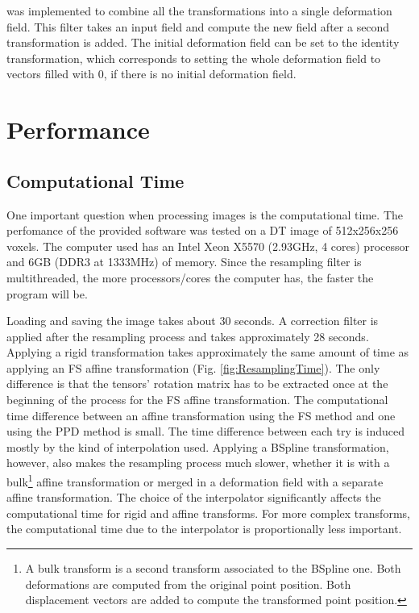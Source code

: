 \documentclass{InsightArticle}
\begin{document}
 was implemented to combine all the transformations into a single deformation field. This filter takes an input field and compute the new field after a second transformation is added. The initial deformation field can be set to the identity transformation, which corresponds to setting the whole deformation field to vectors filled with 0, if there is no initial deformation field.


\section{Performance}
\subsection{Computational Time}

One important question when processing images is the computational time. The perfomance of the provided software was tested on a DT image of 512x256x256 voxels. The computer used has an Intel Xeon X5570 (2.93GHz, 4 cores) processor and 6GB (DDR3 at 1333MHz) of memory. Since the resampling filter is multithreaded, the more processors/cores the computer has, the faster the program will be.

Loading and saving the image takes about 30 seconds. A correction filter is applied after the resampling process and takes approximately 28 seconds. Applying a rigid transformation takes approximately the same amount of time as applying an FS affine transformation (Fig. \ref{fig:ResamplingTime}). The only difference is that the tensors' rotation matrix has to be extracted once at the beginning of the process for the FS affine transformation. The computational time difference between an affine transformation using the FS method and one using the PPD method is small. The time difference between each try is induced mostly by the kind of interpolation used. Applying a BSpline transformation, however, also makes the resampling process much slower, whether it is with a bulk\footnote{A bulk transform is a second transform associated to the BSpline one. Both deformations are computed from the original point position. Both displacement vectors are added to compute the transformed point position.} affine transformation or merged in a deformation field with a separate affine transformation. The choice of the interpolator significantly affects the computational time for rigid and affine transforms. For more complex transforms, the computational time due to the interpolator is proportionally less important.
\end{document}
